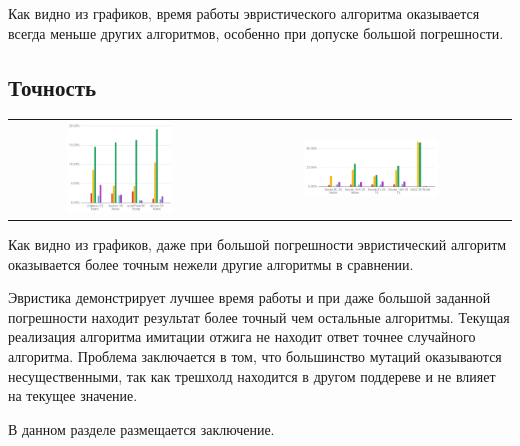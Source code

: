 \documentclass[pscyr,specification,annotation]{itmo-student-thesis}
\begin{document}
    Как видно из графиков, время работы эвристического алгоритма оказывается
    всегда меньше других алгоритмов, особенно при допуске большой погрешности.

\subsection{Точность}
    \begin{center}
    \begin{tabular}{c c}
        \includegraphics[width=0.5\textwidth]{error_easy.png} &
        \includegraphics[width=0.5\textwidth]{error_features.png}
    \end{tabular}
    \end{center}

    Как видно из графиков, даже при большой погрешности эвристический алгоритм
    оказывается более точным нежели другие алгоритмы в сравнении.

\chapterconclusion{}

Эвристика демонстрирует лучшее время работы и при даже большой заданной погрешности 
находит результат более точный чем остальные алгоритмы. Текущая реализация
алгоритма имитации отжига не находит ответ точнее случайного алгоритма. Проблема
заключается в том, что большинство мутаций оказываются несущественными, так как
трешхолд находится в другом поддереве и не влияет на текущее значение.

\conclusionpage{}

В данном разделе размещается заключение.

\printmainbibliography{}
\end{document}
